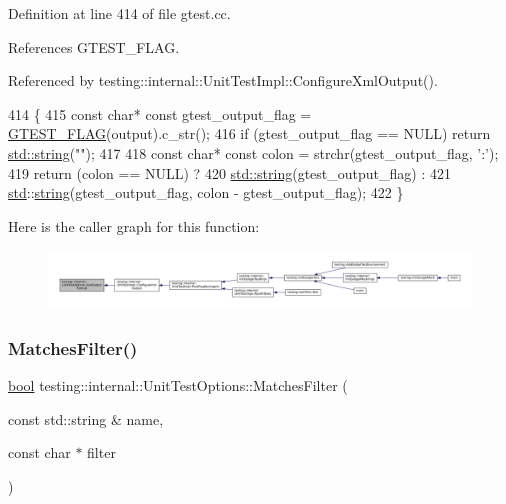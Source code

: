 Definition at line 414 of file gtest.\+cc.



References G\+T\+E\+S\+T\+\_\+\+F\+L\+AG.



Referenced by testing\+::internal\+::\+Unit\+Test\+Impl\+::\+Configure\+Xml\+Output().


\begin{DoxyCode}
414                                            \{
415   \textcolor{keyword}{const} \textcolor{keywordtype}{char}* \textcolor{keyword}{const} gtest\_output\_flag = \hyperlink{gtest-port_8h_a828f4e34a1c4b510da50ec1563e3562a}{GTEST\_FLAG}(output).c\_str();
416   \textcolor{keywordflow}{if} (gtest\_output\_flag == NULL) \textcolor{keywordflow}{return} \hyperlink{namespacetesting_1_1internal_a8e8ff5b11e64078831112677156cb111}{std::string}(\textcolor{stringliteral}{""});
417 
418   \textcolor{keyword}{const} \textcolor{keywordtype}{char}* \textcolor{keyword}{const} colon = strchr(gtest\_output\_flag, \textcolor{charliteral}{':'});
419   \textcolor{keywordflow}{return} (colon == NULL) ?
420       \hyperlink{namespacetesting_1_1internal_a8e8ff5b11e64078831112677156cb111}{std::string}(gtest\_output\_flag) :
421       \hyperlink{namespacestd}{std}::\hyperlink{namespacetesting_1_1internal_a8e8ff5b11e64078831112677156cb111}{string}(gtest\_output\_flag, colon - gtest\_output\_flag);
422 \}
\end{DoxyCode}
Here is the caller graph for this function\+:
\nopagebreak
\begin{figure}[H]
\begin{center}
\leavevmode
\includegraphics[width=350pt]{classtesting_1_1internal_1_1UnitTestOptions_ae7413a21296d885c6924650b51ac4f6d_icgraph}
\end{center}
\end{figure}
\mbox{\label{classtesting_1_1internal_1_1UnitTestOptions_a67fc0adaffbb8d320b92e42e05017e4e}} 
\subsubsection{\texorpdfstring{Matches\+Filter()}{MatchesFilter()}}
{\footnotesize\ttfamily \hyperlink{classbool}{bool} testing\+::internal\+::\+Unit\+Test\+Options\+::\+Matches\+Filter (\begin{DoxyParamCaption}\item[{const std\+::string \&}]{name,  }\item[{const char $\ast$}]{filter }\end{DoxyParamCaption})\hspace{0.3cm}{\ttfamily [static]}}



